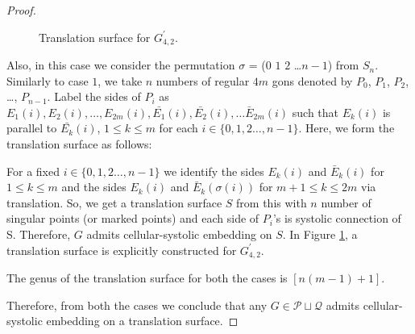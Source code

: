 \documentclass[10pt,a4paper]{amsart}
\begin{document}
\begin{proof}
\begin{figure}[htbp]
\begin{center}
\caption{Translation surface for $G_{4,2}^\prime$.}
\label{figure17}
\end{center}
\end{figure}
Also, in this case we  consider the permutation $\sigma$ = ($0$ $1$ $2$ \dots $n-1$) from $S_n$. Similarly to case $1$, we take $n$ numbers of regular $4m$ gons denoted by $P_0$, $P_1$, $P_2$, \dots, $P_{n-1}$. Label the sides of $P_i$ as $E_1(i), E_2(i), \dots, E_{2m}(i), \bar{E_1}(i), \bar{E_2}(i), 
\dots \bar{E}_{2m}(i)$ such that $E_k(i)$ is parallel to $\bar{E_k}(i)$, $1\leq k\leq m$ for each $i\in \{0,1,2 \dots, n-1\}$. Here, we form the translation surface as follows:

For a fixed $i\in \{0,1,2 \dots, n-1\}$ we identify the sides $E_k(i)$ and $\bar{E}_k(i)$  for $1\le k\le m$ and the sides $E_k(i)$ and $\bar{E}_k(\sigma(i))$ for $m+1\le k\le 2m$ via translation. So, we get a translation surface $S$ from this with $n$ number of singular points (or marked points) and each side of $P_i$'s is systolic connection of S. Therefore, $G$ admits cellular-systolic embedding on $S$. In Figure \ref{figure17}, a translation surface is explicitly constructed for $G_{4,2}^\prime$. 

The genus of the translation surface for both the cases is $\left[n(m-1)+1\right]$.

Therefore, from both the cases we conclude that any $G\in \mathcal{P} \sqcup \mathcal{Q}$ admits cellular-systolic embedding on a translation surface.

\end{proof}
\end{document}
